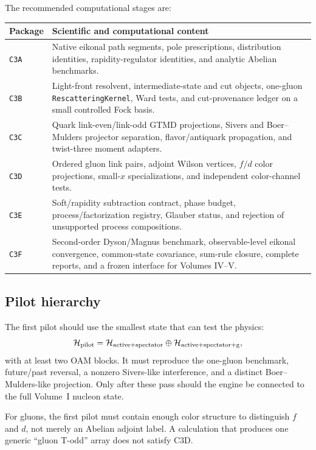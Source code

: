 \documentclass[11pt]{article}
\newcommand{\Hil}{\mathcal H}
\begin{document}
The recommended computational stages are:
\begin{longtable}{L{0.14\textwidth}L{0.76\textwidth}}
\toprule
Package & Scientific and computational content\\
\midrule
\endhead
\texttt{C3A} &
Native eikonal path segments, pole prescriptions, distribution identities,
rapidity-regulator identities, and analytic Abelian benchmarks.\\
\texttt{C3B} &
Light-front resolvent, intermediate-state and cut objects, one-gluon
\texttt{RescatteringKernel}, Ward tests, and cut-provenance ledger on a small
controlled Fock basis.\\
\texttt{C3C} &
Quark link-even/link-odd GTMD projections, Sivers and Boer--Mulders projector
separation, flavor/antiquark propagation, and twist-three moment adapters.\\
\texttt{C3D} &
Ordered gluon link pairs, adjoint Wilson vertices, \(f/d\) color projections,
small-\(x\) specializations, and independent color-channel tests.\\
\texttt{C3E} &
Soft/rapidity subtraction contract, phase budget, process/factorization
registry, Glauber status, and rejection of unsupported process compositions.\\
\texttt{C3F} &
Second-order Dyson/Magnus benchmark, observable-level eikonal convergence,
common-state covariance, sum-rule closure, complete reports, and a frozen
interface for Volumes IV--V.\\
\bottomrule
\end{longtable}

\subsection{Pilot hierarchy}

The first pilot should use the smallest state that can test the physics:
\begin{equation}
 \Hil_{\rm pilot}
 =\Hil_{\rm active+spectator}
  \oplus\Hil_{\rm active+spectator+g},
\label{eq:pilot-hilbert-space}
\end{equation}
with at least two OAM blocks.  It must reproduce the one-gluon benchmark,
future/past reversal, a nonzero Sivers-like interference, and a distinct
Boer--Mulders-like projection.  Only after these pass should the engine be
connected to the full Volume~I nucleon state.

For gluons, the first pilot must contain enough color structure to distinguish
\(f\) and \(d\), not merely an Abelian adjoint label.  A calculation that
produces one generic ``gluon T-odd'' array does not satisfy C3D.
\end{document}
